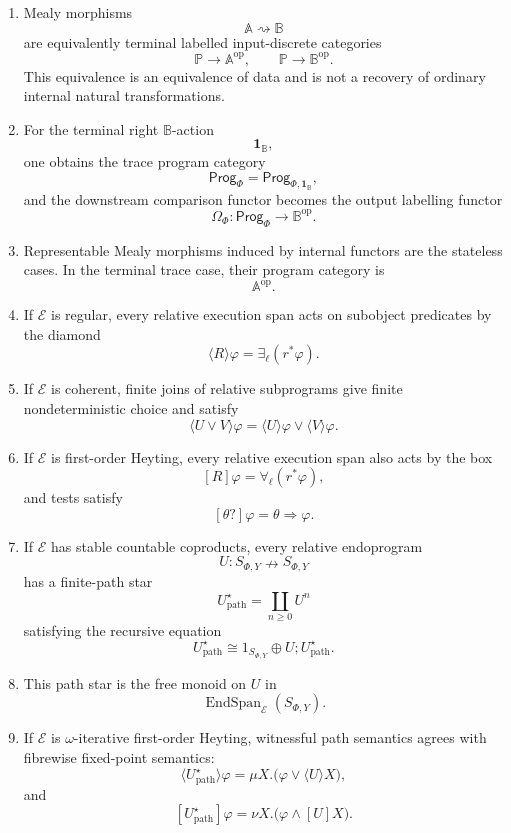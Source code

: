 \begin{theorem}
\begin{enumerate}
\item Mealy morphisms
\[
\mathbb A\rightsquigarrow\mathbb B
\]
are equivalently terminal labelled input-discrete categories
\[
\mathbb P\to\mathbb A^{\mathrm{op}},
\qquad
\mathbb P\to\mathbb B^{\mathrm{op}}.
\]
This equivalence is an equivalence of data and is not a recovery of ordinary
internal natural transformations.

\item For the terminal right \(\mathbb B\)-action
\[
\mathbf 1_{\mathbb B},
\]
one obtains the trace program category
\[
\mathsf{Prog}_\Phi
=
\mathsf{Prog}_{\Phi,\mathbf 1_{\mathbb B}},
\]
and the downstream comparison functor becomes the output labelling functor
\[
\Omega_\Phi:\mathsf{Prog}_\Phi\to\mathbb B^{\mathrm{op}}.
\]

\item Representable Mealy morphisms induced by internal functors are the
stateless cases. In the terminal trace case, their program category is
\[
\mathbb A^{\mathrm{op}}.
\]

\item If \(\mathcal E\) is regular, every relative execution span acts on
subobject predicates by the diamond
\[
\langle R\rangle\varphi=\exists_\ell(r^\ast\varphi).
\]

\item If \(\mathcal E\) is coherent, finite joins of relative subprograms give
finite nondeterministic choice and satisfy
\[
\langle U\vee V\rangle\varphi
=
\langle U\rangle\varphi
\vee
\langle V\rangle\varphi.
\]

\item If \(\mathcal E\) is first-order Heyting, every relative execution span
also acts by the box
\[
[R]\varphi=\forall_\ell(r^\ast\varphi),
\]
and tests satisfy
\[
[\theta?]\varphi=\theta\Rightarrow\varphi.
\]

\item If \(\mathcal E\) has stable countable coproducts, every relative
endoprogram
\[
U:S_{\Phi,Y}\nrightarrow S_{\Phi,Y}
\]
has a finite-path star
\[
U^\star_{\mathrm{path}}
=
\coprod_{n\ge0}U^n
\]
satisfying the recursive equation
\[
U^\star_{\mathrm{path}}
\cong
1_{S_{\Phi,Y}}\oplus U;U^\star_{\mathrm{path}}.
\]

\item This path star is the free monoid on \(U\) in
\[
\operatorname{EndSpan}_{\mathcal E}(S_{\Phi,Y}).
\]

\item If \(\mathcal E\) is \(\omega\)-iterative first-order Heyting, witnessful
path semantics agrees with fibrewise fixed-point semantics:
\[
\langle U^\star_{\mathrm{path}}\rangle\varphi
=
\mu X.\bigl(\varphi\vee\langle U\rangle X\bigr),
\]
and
\[
[U^\star_{\mathrm{path}}]\varphi
=
\nu X.\bigl(\varphi\wedge[U]X\bigr).
\]


\end{enumerate}
\end{theorem}
